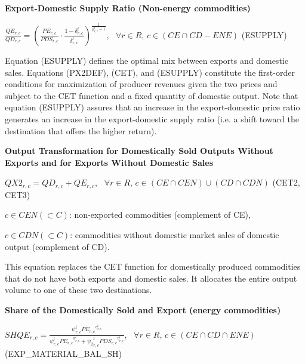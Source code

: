 \documentclass[10pt,a4paper,titlepage,dvipdfmx]{book}
\begin{document}
\begin{flushleft}\textbf{Export-Domestic Supply Ratio (Non-energy commodities)}\end{flushleft}


\begin{center}$\frac{QE_{r,c}}{QD_{r,c}}=\left(\frac{PE_{r,c}}{PDS_{r,c}}\cdot \frac{1-\delta _{r,c}^{t}}{\delta _{r,c}^{t}}\right)^{\frac{1}{\rho _{r,c}^{t}-1}},\,\,\,\,\forall r\in R,\,c\in \left(CE\cap CD-ENE\right)$ (ESUPPLY)
\end{center}

Equation (ESUPPLY) defines the optimal mix between exports and domestic sales. Equations (PX2DEF), (CET), and (ESUPPLY) constitute the first-order conditions for maximization of producer revenues given the two prices and subject to the CET function and a fixed quantity of domestic output. Note that equation (ESUPPLY) assures that an increase in the export-domestic price ratio generates an increase in the export-domestic supply ratio (i.e. a shift toward the destination that offers the higher return).

\begin{flushleft}\textbf{Output Transformation for Domestically Sold Outputs Without Exports and for Exports Without Domestic Sales}\end{flushleft}


\begin{center}$QX2_{r,c}=QD_{r,c}+QE_{r,c},\,\,\,\,\forall r\in R,\,c\in \left(CE\cap CEN\right)\cup \left(CD\cap CDN\right)$ (CET2, CET3)
\end{center}

\begin{flushleft}
$c\in CEN\left(\subset C\right)$: non-exported commodities (complement of CE),

$c\in CDN\left(\subset C\right)$: commodities without domestic market sales of domestic output (complement of CD).
\end{flushleft}

This equation replaces the CET function for domestically produced commodities that do not have both exports and domestic sales. It allocates the entire output volume to one of these two destinations.

\begin{flushleft}\textbf{Share of the Domestically Sold and Export (energy commodities)}\end{flushleft}


\begin{center}$SHQE_{r,c}=\frac{\psi _{r,c}^{t}P{E_{r,c}}^{\eta _{r,c}^{t}}}{\psi _{r,c}^{t}P{E_{r,c}}^{\eta _{r,c}^{t}}+{\psi _{2}}_{r,c}^{t}PD{S_{r,c}}^{\eta _{r,c}^{t}}},\,\,\,\,\forall r\in R,\,c\in \left(CE\cap CD\cap ENE\right)$ (EXP\_MATERIAL\_BAL\_SH)
\end{center}
\end{document}
